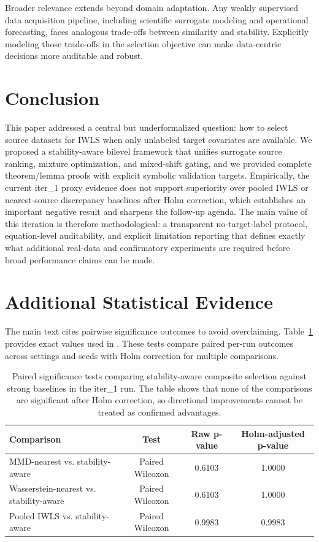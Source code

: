 \documentclass{article} %
\begin{document}
Broader relevance extends beyond domain adaptation. Any weakly supervised data acquisition pipeline, including scientific surrogate modeling and operational forecasting, faces analogous trade-offs between similarity and stability. Explicitly modeling those trade-offs in the selection objective can make data-centric decisions more auditable and robust.

\section{Conclusion}
This paper addressed a central but underformalized question: how to select source datasets for IWLS when only unlabeled target covariates are available. We proposed a stability-aware bilevel framework that unifies surrogate source ranking, mixture optimization, and mixed-shift gating, and we provided complete theorem/lemma proofs with explicit symbolic validation targets. Empirically, the current iter\_1 proxy evidence does not support superiority over pooled IWLS or nearest-source discrepancy baselines after Holm correction, which establishes an important negative result and sharpens the follow-up agenda. The main value of this iteration is therefore methodological: a transparent no-target-label protocol, equation-level auditability, and explicit limitation reporting that defines exactly what additional real-data and confirmatory experiments are required before broad performance claims can be made.






\appendix
\section{Additional Statistical Evidence}
The main text cites pairwise significance outcomes to avoid overclaiming. Table~\ref{tab:significance} provides exact values used in . These tests compare paired per-run outcomes across settings and seeds with Holm correction for multiple comparisons.

\begin{table}[h]
\caption{Paired significance tests comparing stability-aware composite selection against strong baselines in the iter\_1 run. The table shows that none of the comparisons are significant after Holm correction, so directional improvements cannot be treated as confirmed advantages.}
\label{tab:significance}
\centering
\small
\renewcommand{\arraystretch}{1.1}
\setlength{\tabcolsep}{4pt}
\begin{tabular}{lccc}
\hline
Comparison & Test & Raw p-value & Holm-adjusted p-value \\
\hline
MMD-nearest vs. stability-aware & Paired Wilcoxon & 0.6103 & 1.0000 \\
Wasserstein-nearest vs. stability-aware & Paired Wilcoxon & 0.6103 & 1.0000 \\
Pooled IWLS vs. stability-aware & Paired Wilcoxon & 0.9983 & 0.9983 \\
\hline
\end{tabular}
\end{table}
\end{document}
